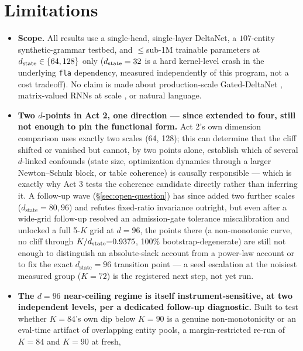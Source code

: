 \section{Limitations}
\label{sec:limitations}

\begin{itemize}
  \item \textbf{Scope.} All results use a single-head, single-layer
    DeltaNet, a $107$-entity synthetic-grammar testbed, and $\leq$sub-1M
    trainable parameters at $d_{\mathrm{state}} \in \{64, 128\}$ only ($d_{\mathrm{state}}=32$ is
    a hard kernel-level crash in the underlying \texttt{fla} dependency,
    measured independently of this program, not a cost tradeoff). No claim
    is made about production-scale Gated-DeltaNet
    \citep{siems2025deltaproduct, grazzi2025negative}, matrix-valued RNNs
    at scale \citep{mishra2026m2rnn}, or natural language.
  \item \textbf{Two $d$-points in Act 2, one direction --- since extended
    to four, still not enough to pin the functional form.} Act 2's own
    dimension comparison uses exactly two scales (64, 128); this can
    determine that the cliff shifted or vanished but cannot, by two points
    alone, establish which of several $d$-linked confounds (state size,
    optimization dynamics through a larger Newton--Schulz block, or table
    coherence) is causally responsible --- which is exactly why Act 3 tests
    the coherence candidate directly rather than inferring it. A follow-up
    wave (\S\ref{sec:open-question}) has since added two further scales
    ($d_{\mathrm{state}}{=}80, 96$) and refutes fixed-ratio invariance
    outright, but even after a wide-grid follow-up resolved an
    admission-gate tolerance miscalibration and unlocked a full
    5-$K$ grid at $d{=}96$, the points there (a non-monotonic curve, no
    cliff through $K/d_{\mathrm{state}}{=}0.9375$, 100\% bootstrap-degenerate) are
    still not enough to distinguish an absolute-slack account from a
    power-law account or to fix the exact $d_{\mathrm{state}}{=}96$
    transition point --- a seed escalation at the noisiest measured group
    ($K{=}72$) is the registered next step, not yet run.
  \item \textbf{The $d{=}96$ near-ceiling regime is itself instrument-sensitive,
    at two independent levels, per a dedicated follow-up diagnostic.} Built
    to test whether $K{=}84$'s own dip below $K{=}90$ is a genuine
    non-monotonicity or an eval-time artifact of overlapping entity pools,
    a margin-restricted re-run of $K{=}84$ and $K{=}90$ at fresh,

\end{itemize}

